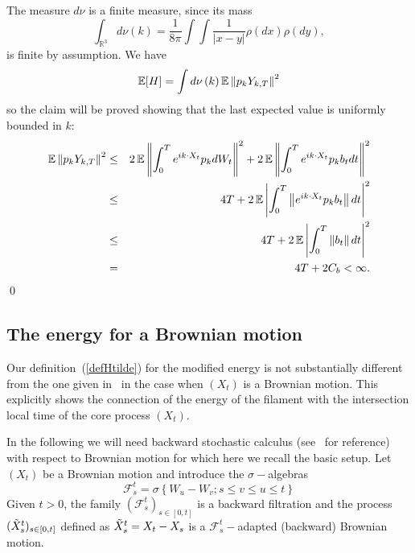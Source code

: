 The measure $d\nu$ is a finite measure, since its mass  
$$
\int_{\mathbb{R}^3} d\nu(k) = \frac{1}{8 \pi} \int \int \frac{1}{\left|
x-y\right|}\rho \left( dx\right) \rho \left( dy\right), 
$$
is finite by assumption. We have 
\begin{equation*}
\operatorname{{\mathbb E}} [H] =\int d\nu \left( k\right) \operatorname{{\mathbb E}} \left\| p_k Y_{k,T} \right\|^{2}
\end{equation*}
so the claim will be proved showing that the last expected value is
uniformly bounded in $k$: 
\begin{eqnarray*}
\operatorname{{\mathbb E}} \left\| p_k Y_{k,T}\right\|^{2}   
&\leq & 2 \operatorname{{\mathbb E}} \left\| \int_{0}^{T}e^{ik\cdot
    X_{t}} p_k dW_{t}\right\|^{2} 
+2\operatorname{{\mathbb E}}\left\| \int_{0}^{T}e^{ik\cdot
X_{t}} p_k b_{t}dt\right\|^{2}  \\
&\leq & 4T + 2\operatorname{{\mathbb E}} \left| \int_{0}^{T}\left\| e^{ik\cdot X_{t}} p_k
    b_{t}\right\|
 dt\right| ^{2}  \\
&\leq &4T+2\operatorname{{\mathbb E}}  \left| \int_{0}^{T}\left\|  b_{t}\right\| dt\right|
^{2} \\ &
= & 4T+2C_{b} < \infty.
\end{eqnarray*}
\qed

\subsection{The energy for a Brownian motion}
\label{sec:otherexp}
Our definition~(\ref{defHtilde}) for the modified energy is not substantially
different from the one given in~\cite{Fl2} in the case when $(X_t)$ is
a Brownian motion. This  explicitly shows the 
connection of the energy of the filament with the intersection local time of the core
process $(X_t)$. 

In the following we will need backward stochastic calculus (see~\cite{Ku} for
reference) with respect to
Brownian motion for which here we recall the basic setup. 
Let $(X_t)$ be a Brownian motion and introduce the $\sigma-$algebras
$$
\mathcal{F}^t_s = \sigma\left\{ W_u - W_v ; s \le v \le u \le t \right\}
$$
Given $t >0$, the family $(\mathcal{F}^t_s)_{s\in [0,t]}$ is a backward
filtration and the process $(\Tilde{X}^t_s)_{s\in [0,t]}$ defined as
$\Tilde{X}^t_s = X_t - X_s$ is a $\mathcal{F}^t_s-$adapted (backward)
Brownian motion. 

